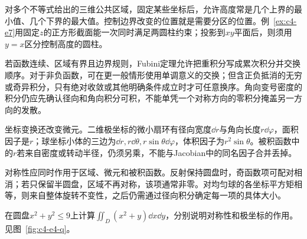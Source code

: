 对多个不等式给出的三维公共区域，固定某些坐标后，允许高度常是几个上界的最小值、几个下界的最大值。控制边界改变的位置就是需要分区的位置。例~\ref{ex:c4-e7}用固定$z$的正方形截面能一次同时满足两圆柱约束；投影到$xy$平面后，则须用$y=x$区分控制高度的圆柱。

若函数连续、区域有界且边界规则，Fubini定理允许把重积分写成累次积分并交换顺序。对于非负函数，可在更一般情形使用单调意义的交换；但含正负抵消的无穷或奇异积分，只有绝对收敛或其他明确条件成立时才可任意换序。角向变号密度的积分仍应先确认径向和角向积分可积，不能单凭一个对称方向的零积分掩盖另一方向的发散。

坐标变换还改变微元。二维极坐标的微小扇环有径向宽度$\dd r$与角向长度$r\dd\varphi$，面积因子是$r$；球坐标小体的三边为$\dd r,r\dd\theta,r\sin\theta\dd\varphi$，体积因子为$r^2\sin\theta$。被积函数中的$r$若来自密度或转动半径，仍须另乘，不能与Jacobian中的同名因子合并丢掉。

对称性应同时作用于区域、微元和被积函数。反射保持圆盘时，奇函数项可配对相消；若只保留半圆盘，区域不再对称，该项通常非零。对均匀球的各坐标平方矩相等，则来自整体旋转不变性，之后仍需通过径向积分确定每一项的具体大小。

\begin{example}[圆盘上的偶项与奇项]\label{ex:c4-e4}
在圆盘$x^2+y^2\le9$上计算$\iint_D(x^2+y)\dd x\dd y$，分别说明对称性和极坐标的作用。 见图~\ref{fig:c4-e4-q}。
\end{example}

